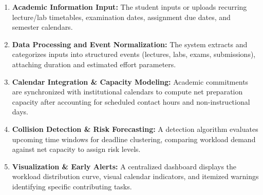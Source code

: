 \documentclass[11pt,a4paper]{article}
\begin{document}
\begin{enumerate}

\item \textbf{Academic Information Input:}
The student inputs or uploads recurring lecture/lab timetables, examination dates, assignment due dates, and semester calendars.

\vspace{3mm}

\item \textbf{Data Processing and Event Normalization:}
The system extracts and categorizes inputs into structured events (lectures, labs, exams, submissions), attaching duration and estimated effort parameters.

\vspace{3mm}

\item \textbf{Calendar Integration \& Capacity Modeling:}
Academic commitments are synchronized with institutional calendars to compute net preparation capacity after accounting for scheduled contact hours and non-instructional days.

\vspace{3mm}

\item \textbf{Collision Detection \& Risk Forecasting:}
A detection algorithm evaluates upcoming time windows for deadline clustering, comparing workload demand against net capacity to assign risk levels.

\vspace{3mm}

\item \textbf{Visualization \& Early Alerts:}
A centralized dashboard displays the workload distribution curve, visual calendar indicators, and itemized warnings identifying specific contributing tasks.

\end{enumerate}


\begin{center}


\end{center}
\end{document}

